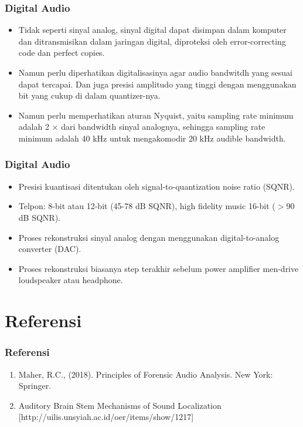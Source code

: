 \documentclass[pdflatex,compress]{beamer}
\begin{document}
\begin{frame}
	\frametitle{Digital Audio}
	\begin{itemize}
		\item Tidak seperti sinyal analog, sinyal digital dapat disimpan dalam komputer dan ditransmisikan dalam jaringan digital, diproteksi oleh error-correcting code dan perfect copies.
		\item Namun perlu diperhatikan digitalisasinya agar audio bandwitdh yang sesuai dapat tercapai. Dan juga presisi amplitudo yang tinggi dengan menggunakan bit yang cukup di dalam quantizer-nya.
		\item Namun perlu memperhatikan aturan Nyquist, yaitu sampling rate minimum adalah 2 $\times$ dari bandwidth sinyal analognya, sehingga sampling rate minimum adalah 40 kHz untuk mengakomodir 20 kHz audible bandwidth.
	\end{itemize}
\end{frame}

\begin{frame}
	\frametitle{Digital Audio}
	\begin{itemize}
		\item Presisi kuantisasi ditentukan oleh signal-to-quantization noise ratio (SQNR).
		\item Telpon: 8-bit atau 12-bit (45-78 dB SQNR), high fidelity music 16-bit ($ > $90 dB SQNR).
		\item Proses rekonstruksi sinyal analog dengan menggunakan digital-to-analog converter (DAC).
		\item Proses rekonstruksi biasanya step terakhir sebelum power amplifier men-drive loudspeaker atau headphone.
	\end{itemize}
\end{frame}

\section{Referensi}

\begin{frame}
	\frametitle{Referensi}
	\begin{enumerate}
		\item Maher, R.C., (2018). Principles of Forensic Audio Analysis. New York: Springer.
		\item Auditory Brain Stem Mechanisms of Sound Localization [http://uilis.unsyiah.ac.id/oer/items/show/1217]
	\end{enumerate}
\end{frame}
\end{document}
